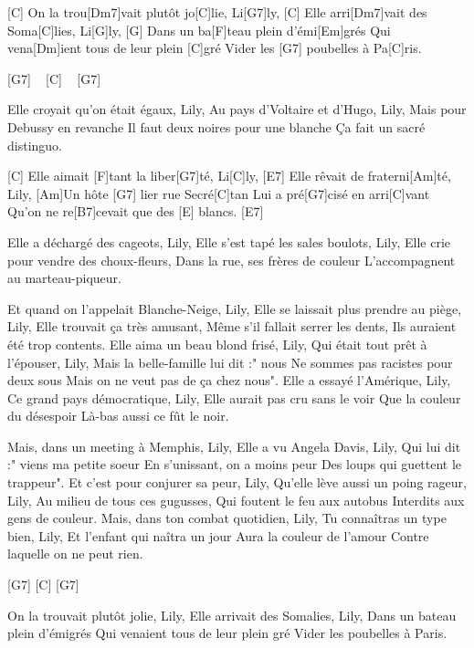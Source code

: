 
\begin{guitar}

  [C]  On la trou[Dm7]vait plutôt jo[C]lie, Li[G7]ly,
 [C]  Elle arri[Dm7]vait des Soma[C]lies, Li[G]ly,
 [G]  Dans un ba[F]teau plein d'émi[Em]grés
Qui vena[Dm]ient tous de leur plein  [C]gré
Vider les  [G7] poubelles à Pa[C]ris.
 
 
 [G7] ~  [C]  ~ [G7] 
 
 
 Elle croyait qu'on était égaux, Lily,
 Au pays d'Voltaire et d'Hugo, Lily,
 Mais pour Debussy en revanche
 Il faut deux noires pour une blanche
 Ça fait un sacré distinguo.

 [C] Elle aimait [F]tant la liber[G7]té, Li[C]ly,
 [E7] Elle rêvait de fraterni[Am]té, Lily,
 [Am]Un hôte [G7] lier rue Secré[C]tan
Lui a pré[G7]cisé en arri[C]vant
Qu'on ne re[B7]cevait que des [E] blancs.  [E7] 

Elle a déchargé des cageots, Lily,
Elle s'est tapé les sales boulots, Lily,
Elle crie pour vendre des choux-fleurs,
Dans la rue, ses frères de couleur
L'accompagnent au marteau-piqueur.
 
 
Et quand on l'appelait Blanche-Neige, Lily,
Elle se laissait plus prendre au piège, Lily,
Elle trouvait ça très amusant,
Même s'il fallait serrer les dents,
Ils auraient été trop contents.
Elle aima un beau blond frisé, Lily,
Qui était tout prêt à l'épouser, Lily,
Mais la belle-famille lui dit :" nous
Ne sommes pas racistes pour deux sous
Mais on ne veut pas de ça chez nous".
Elle a essayé l'Amérique, Lily,
Ce grand pays démocratique, Lily,
Elle aurait pas cru sans le voir
Que la couleur du désespoir
Là-bas aussi ce fût le noir.
 
 
Mais, dans un meeting à Memphis, Lily,
Elle a vu Angela Davis, Lily,
Qui lui dit :" viens ma petite soeur
En s'unissant, on a moins peur
Des loups qui guettent le trappeur".
Et c'est pour conjurer sa peur, Lily,
Qu'elle lève aussi un poing rageur, Lily,
Au milieu de tous ces gugusses,
Qui foutent le feu aux autobus
Interdits aux gens de couleur.
Mais, dans ton combat quotidien, Lily,
Tu connaîtras un type bien, Lily,
Et l'enfant qui naîtra un jour
Aura la couleur de l'amour
Contre laquelle on ne peut rien.
 
 [G7]   [C]   [G7] 
 
On la trouvait plutôt jolie, Lily,
Elle arrivait des Somalies, Lily,
Dans un bateau plein d'émigrés
Qui venaient tous de leur plein gré
Vider les poubelles à Paris.

\end{guitar}